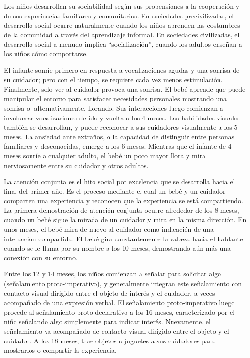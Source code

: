 \documentclass[11pt,letterpaper]{report}
\begin{document}
Los niños desarrollan su sociabilidad según sus propensiones a la cooperación y
de sus experiencias familiares y comunitarias. En sociedades precivilizadas, el
desarrollo social ocurre naturalmente cuando los niños aprenden las costumbres
de la comunidad a través del aprendizaje informal. En sociedades civilizadas,
el desarrollo social a menudo implica ``socialización'', cuando los adultos
enseñan a los niños cómo comportarse. \cite{Narvaez2021}

El infante sonríe primero en respuesta a vocalizaciones agudas y una sonrisa de
su cuidador; pero con el tiempo, se requiere cada vez menos estimulación.
Finalmente, solo ver al cuidador provoca una sonrisa. El bebé aprende que puede
manipular el entorno para satisfacer necesidades personales mostrando una
sonrisa o, alternativamente, llorando. Sus interacciones luego comienzan a
involucrar vocalizaciones de ida y vuelta a los 4 meses. Las habilidades
visuales también se desarrollan, y puede reconocer a sus cuidadores visualmente
a los 5 meses. La ansiedad ante extraños, o la capacidad de distinguir entre
personas familiares y desconocidas, emerge a los 6 meses. Mientras que el
infante de 4 meses sonríe a cualquier adulto, el bebé un poco mayor llora y
mira nerviosamente entre su cuidador y otros adultos.
\cite{Gerber2011}

La atención conjunta es el hito social por excelencia que se desarrolla hacia
el final del primer año. Es el proceso mediante el cual un bebé y un cuidador
comparten una experiencia y reconocen que la experiencia se está compartiendo.
La primera demostración de atención conjunta ocurre alrededor de los 8 meses,
cuando un bebé sigue la mirada de un cuidador y mira en la misma dirección. En
unos meses, el bebé mira de nuevo al cuidador como indicación de una
interacción compartida. El bebé gira constantemente la cabeza hacia el hablante
cuando se le llama por su nombre a los 10 meses, demostrando aún más una
conexión con su entorno. \cite{Gerber2011}

Entre los 12 y 14 meses, los niños comienzan a señalar para solicitar algo
(señalamiento proto-imperativo), y generalmente integran este señalamiento con
contacto visual dirigido entre el objeto de interés y el cuidador, a veces
acompañado de una expresión verbal. El señalamiento proto-imperativo luego
procede al señalamiento proto-declarativo a los 16 meses, caracterizado por el
niño señalando algo simplemente para indicar interés. Nuevamente, el
señalamiento va acompañado de contacto visual dirigido entre el objeto y el
cuidador. A los 18 meses, trae objetos o juguetes a sus cuidadores para
mostrarlos o compartir la experiencia. \cite{Gerber2011}
\end{document}
